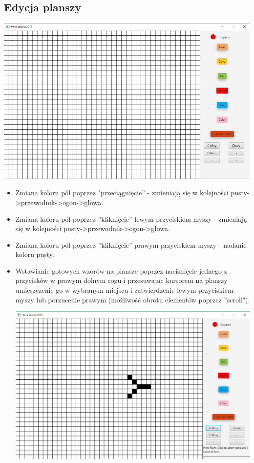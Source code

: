 \documentclass[a4paper,11pt]{article}
\begin{document}
\subsection{Edycja planszy}
\includegraphics[width=\textwidth]{mainScreen}
\begin{itemize}
\item Zmiana koloru pól poprzez "przeciągnięcie'' - zmieniają się w kolejności pusty->przewodnik->ogon->głowa.
\item Zmiana koloru pól poprzez ''kliknięcie'' lewym przyciskiem myszy - zmieniają się w kolejności pusty->przewodnik->ogon->głowa.
\item Zmiana koloru pól poprzez ''kliknięcie'' prawym przyciskiem myszy - nadanie koloru pusty.
\item Wstawianie gotowych wzorów na plansze poprzez naciśnięcie jednego z przycisków w prawym dolnym rogu i przesuwając kursorem na planszy umieszczenie go w wybranym miejscu i zatwierdzenie lewym przyciskiem myszy lub porzucenie prawym (możliwość obrotu elementów poprzez ''scroll").

\includegraphics[width=\textwidth]{insertTemplate}
 
\end{itemize}
\end{document}
